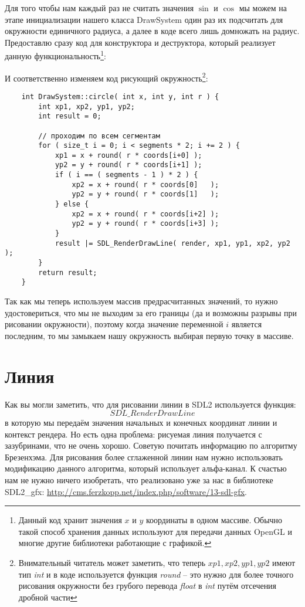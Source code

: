 Для того чтобы нам каждый раз не считать значения \( \sin \) и \( \cos \) мы можем на этапе 
инициализации нашего класса DrawSystem один раз их подсчитать для окружности единичного радиуса, а 
далее в коде всего лишь домножать на радиус. Предоставлю сразу код для конструктора и деструктора, 
который реализует данную функциональность\footnote{Данный код хранит значения \( x \) и 
\( y \) координаты в одном массиве. Обычно такой способ хранения данных используют для передачи 
данных OpenGL и многие другие библиотеки работающие с графикой.}:


\newpage

И соответственно изменяем код рисующий окружность\footnote{Внимательный читатель может заметить, 
что теперь \( xp1, xp2, yp1, yp2 \) имеют тип \emph{int} и в коде используется функция 
\emph{round} -- это нужно для более точного рисования окружности без грубого перевода \emph{float} в 
\emph{int} путём отсечения дробной части}:
\begin{lstlisting}
    int DrawSystem::circle( int x, int y, int r ) {
        int xp1, xp2, yp1, yp2;
        int result = 0;

        // проходим по всем сегментам
        for ( size_t i = 0; i < segments * 2; i += 2 ) {
            xp1 = x + round( r * coords[i+0] );
            yp2 = y + round( r * coords[i+1] );
            if ( i == ( segments - 1 ) * 2 ) {
                xp2 = x + round( r * coords[0]   );
                yp2 = y + round( r * coords[1]   );
            } else {
                xp2 = x + round( r * coords[i+2] );
                yp2 = y + round( r * coords[i+3] );
            }
            result |= SDL_RenderDrawLine( render, xp1, yp1, xp2, yp2 );
        }
        return result;
    }
\end{lstlisting}

Так как мы теперь используем массив предрасчитанных значений, то нужно удостовериться, что мы 
не выходим за его границы (да и возможны разрывы при рисовании окружности), поэтому когда 
значение переменной \( i \) является последним, то мы замыкаем нашу окружность выбирая 
первую точку в массиве. 

\section{Линия}
Как вы могли заметить, что для рисовании линии в SDL2 используется функция:
\[ 
    SDL\_RenderDrawLine 
\]
в которую мы передаём значения начальных и конечных координат линии и контекст рендера. Но есть 
одна проблема: рисуемая линия получается с зазубринами, что не очень хорошо. Советую почитать 
информацию по алгоритму Брезенхэма. Для рисования более сглаженной линии нам нужно использовать 
модификацию данного алгоритма, который использует альфа-канал. К счастью нам не нужно ничего 
изобретать, что реализовано уже за нас в библиотеке SDL2\_gfx: 
\url{http://cms.ferzkopp.net/index.php/software/13-sdl-gfx}.

